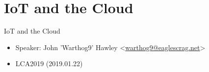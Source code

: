 \section{IoT and the Cloud}

\begin{frame}
   {IoT and the Cloud}
   \begin{itemize}
      \item Speaker: John 'Warthog9' Hawley \textless\url{warthog9@eaglescrag.net}\textgreater
      \item LCA2019 (2019.01.22)
   \end{itemize}
\end{frame}

\cprotect{}

